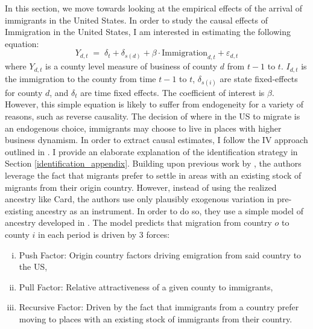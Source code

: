 
        In this section, we move towards looking at the empirical effects of the arrival of immigrants in the United States. In order to study the causal effects of Immigration in the United States, I am interested in estimating the following equation:
   \begin{equation}\label{eq:main}
     Y_{d,t} \;=\; \delta_t + \delta_{s(d)} + \beta \cdot \text{Immigration}_{d,t} + \varepsilon_{d,t}
    \end{equation}
    where $Y_{d,t}$ is a county level measure of business of county $d$ from $t-1$ to $t$. $I_{d,t}$ is the immigration to the county from time $t-1$ to $t$, $\delta_{s(i)}$ are state fixed-effects for county $d$, and $\delta_t$ are time fixed effects. The coefficient of interest is $\beta$. However, this simple equation is likely to suffer from endogeneity for a variety of reasons, such as reverse causality. The decision of where in the US to migrate is an endogenous choice, immigrants may choose to live in places with higher business dynamism. In order to extract causal estimates, I follow the IV approach outlined in \cite{ImmigrationInnovationGrowth}. I provide an elaborate explanation of the identification strategy in Section \ref{identification_appendix}. Building upon previous work by \cite{CardShiftShare}, the authors leverage the fact that migrants prefer to settle in areas with an existing stock of migrants from their origin country. However, instead of using the realized ancestry like Card, the authors use only plausibly exogenous variation in pre-existing ancestry as an instrument. In order to do so, they use a simple model of ancestry developed in \cite{MigrantsAncestorsandInvestments}. The model predicts that migration from country $o$ to county $i$ in each period is driven by 3 forces:
    \begin{enumerate}[(i)]
        \item Push Factor: Origin country factors driving emigration from said country to the US,
        \item Pull Factor: Relative attractiveness of a given county to immigrants,
        \item Recursive Factor: Driven by the fact that immigrants from a country prefer moving to places with an existing stock of immigrants from their country.
    \end{enumerate}
        
